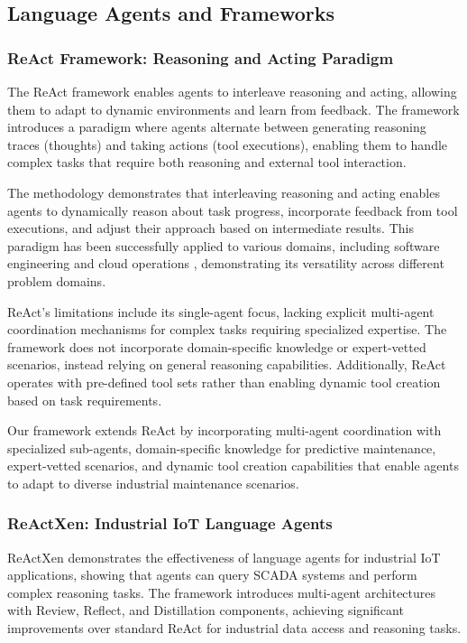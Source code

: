 \documentclass[conference]{IEEEtran}
\begin{document}
\subsection{Language Agents and Frameworks}

\subsubsection{ReAct Framework: Reasoning and Acting Paradigm}

The ReAct framework \cite{yao2023react} enables agents to interleave reasoning and acting, allowing them to adapt to dynamic environments and learn from feedback. The framework introduces a paradigm where agents alternate between generating reasoning traces (thoughts) and taking actions (tool executions), enabling them to handle complex tasks that require both reasoning and external tool interaction.

The methodology demonstrates that interleaving reasoning and acting enables agents to dynamically reason about task progress, incorporate feedback from tool executions, and adjust their approach based on intermediate results. This paradigm has been successfully applied to various domains, including software engineering \cite{jimenez2023swe} and cloud operations \cite{shetty2024aiops}, demonstrating its versatility across different problem domains.

ReAct's limitations include its single-agent focus, lacking explicit multi-agent coordination mechanisms for complex tasks requiring specialized expertise. The framework does not incorporate domain-specific knowledge or expert-vetted scenarios, instead relying on general reasoning capabilities. Additionally, ReAct operates with pre-defined tool sets rather than enabling dynamic tool creation based on task requirements.

Our framework extends ReAct by incorporating multi-agent coordination with specialized sub-agents, domain-specific knowledge for predictive maintenance, expert-vetted scenarios, and dynamic tool creation capabilities that enable agents to adapt to diverse industrial maintenance scenarios.

\subsubsection{ReActXen: Industrial IoT Language Agents}

ReActXen \cite{rayfield2025react} demonstrates the effectiveness of language agents for industrial IoT applications, showing that agents can query SCADA systems and perform complex reasoning tasks. The framework introduces multi-agent architectures with Review, Reflect, and Distillation components, achieving significant improvements over standard ReAct for industrial data access and reasoning tasks.
\end{document}
